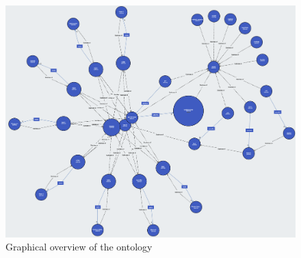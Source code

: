 \begin{figure}[!]
    \centering
    \includegraphics[width=0.8\paperwidth]{media/Screenshot 2023-10-16 at 00.24.06.png}
    \caption{Graphical overview of the ontology}
    \label{fig:ontology}
\end{figure}
